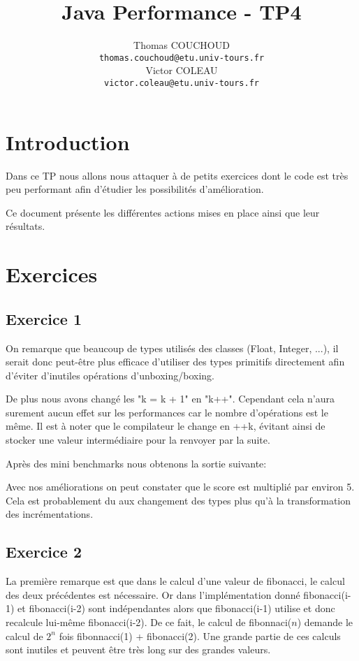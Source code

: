 \documentclass[12pt]{extreport}
\title{Java Performance - TP4}
\author{Thomas COUCHOUD\\\texttt{thomas.couchoud@etu.univ-tours.fr}\\Victor COLEAU\\\texttt{victor.coleau@etu.univ-tours.fr}}
\begin{document}
	\mccTitle
	
	\chapter{Introduction}
		Dans ce TP nous allons nous attaquer à de petits exercices dont le code est très peu performant afin d'étudier les possibilités d'amélioration.
		
		Ce document présente les différentes actions mises en place ainsi que leur résultats.
	
	\chapter{Exercices}
	\section{Exercice 1}
		On remarque que beaucoup de types utilisés des classes (Float, Integer, ...), il serait donc peut-être plus efficace d'utiliser des types primitifs directement afin d'éviter d'inutiles opérations d'unboxing/boxing.
		
		De plus nous avons changé les "k = k + 1" en "k++".
		Cependant cela n'aura surement aucun effet sur les performances car le nombre d'opérations est le même.
		Il est à noter que le compilateur le change en ++k, évitant ainsi de stocker une valeur intermédiaire pour la renvoyer par la suite.
		
		Après des mini benchmarks nous obtenons la sortie suivante:
		
		
		Avec nos améliorations on peut constater que le score est multiplié par environ 5.
		Cela est probablement du aux changement des types plus qu'à la transformation des incrémentations.

	\section{Exercice 2}
		La première remarque est que dans le calcul d'une valeur de fibonacci, le calcul des deux précédentes est nécessaire.
		Or dans l'implémentation donné fibonacci(i-1) et fibonacci(i-2) sont indépendantes alors que fibonacci(i-1) utilise et donc recalcule lui-même fibonacci(i-2).
		De ce fait, le calcul de fibonnaci($n$) demande le calcul de $2^n$ fois fibonnacci(1) + fibonacci(2).
		Une grande partie de ces calculs sont inutiles et peuvent être très long sur des grandes valeurs.
		
\end{document}
